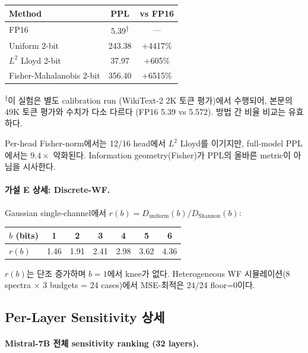 \begin{center}
\small
\begin{tabular}{@{}lcc@{}}
\toprule
Method & PPL & vs FP16 \\
\midrule
FP16 & 5.39\textsuperscript{$\dagger$} & --- \\
Uniform 2-bit & 243.38 & +4417\% \\
$L^2$ Lloyd 2-bit & 37.97 & +605\% \\
Fisher-Mahalanobis 2-bit & 356.40 & +6515\% \\
\bottomrule
\end{tabular}
\end{center}
\textsuperscript{$\dagger$}이 실험은 별도 calibration run (WikiText-2 2K 토큰 평가)에서 수행되어, 본문의 49K 토큰 평가와 수치가 다소 다르다 (FP16 5.39 vs 5.572). 방법 간 비율 비교는 유효하다.

Per-head Fisher-norm에서는 12/16 head에서 $L^2$ Lloyd를 이기지만, full-model PPL에서는 $9.4\times$ 악화된다. Information geometry(Fisher)가 PPL의 올바른 metric이 아님을 시사한다.

\paragraph{가설 E 상세: Discrete-WF.}
Gaussian single-channel에서 $r(b) = D_{\mathrm{uniform}}(b) / D_{\mathrm{Shannon}}(b)$:

\begin{center}
\small
\begin{tabular}{@{}lcccccc@{}}
\toprule
$b$ (bits) & 1 & 2 & 3 & 4 & 5 & 6 \\
\midrule
$r(b)$ & 1.46 & 1.91 & 2.41 & 2.98 & 3.62 & 4.36 \\
\bottomrule
\end{tabular}
\end{center}

$r(b)$는 단조 증가하며 $b=1$에서 knee가 없다. Heterogeneous WF 시뮬레이션(8 spectra $\times$ 3 budgets = 24 cases)에서 MSE-최적은 24/24 floor=0이다.

\subsection{Per-Layer Sensitivity 상세}
\label{sec:appendix_sensitivity}

\paragraph{Mistral-7B 전체 sensitivity ranking (32 layers).}

